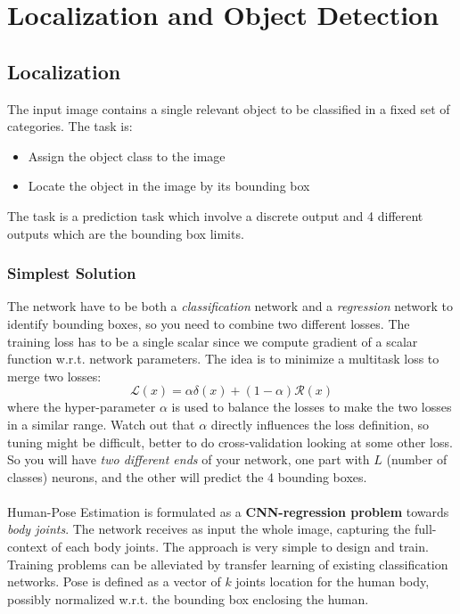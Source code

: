 \section{Localization and Object Detection}
\subsection{Localization}
The input image contains a single relevant object to be classified in a fixed set of categories. The task is:
\begin{itemize}
    \item Assign the object class to the image
    \item Locate the object in the image by its bounding box
\end{itemize}{}

The task is a prediction task which involve a discrete output and 4 different outputs which are the bounding box limits. 

\subsubsection{Simplest Solution}
The network have to be both a \textit{classification} network and a \textit{regression} network to identify bounding boxes, so you need to combine two different losses. The training loss has to be a single scalar since we compute gradient of a scalar function w.r.t. network parameters. The idea is to minimize a multitask loss to merge two losses:
$$
\mathcal{L}(x)=\alpha \delta(x)+(1-\alpha) \mathcal{R}(x)
$$
where the hyper-parameter $\alpha$ is used to balance the losses to make the two losses in a similar range. Watch out that $\alpha$ directly influences the loss definition, so tuning might be difficult, better to do cross-validation looking at some other loss.\\
So you will have \textit{two different ends} of your network, one part with $L$ (number of classes) neurons, and the other will predict the 4 bounding boxes. \\ \\
Human-Pose Estimation is formulated as a \textbf{CNN-regression problem} towards \textit{body joints}. The network receives as input the whole image, capturing the full-context of each body joints.
The approach is very simple to design and train. Training problems can be alleviated by transfer learning of existing classification networks. 
Pose is defined as a vector of $k$ joints location for the human body, possibly normalized w.r.t. the bounding box enclosing the human. 

